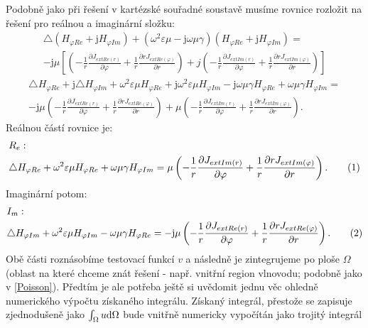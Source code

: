 \documentclass[12pt,a4paper,oneside]{article}
\numberwithin{equation}{section} %
\numberwithin{figure}{section} %
\numberwithin{table}{section} %
\newcommand{\mj}{\mathrm{j}} %
\newcommand\numberthis{\addtocounter{equation}{1}\tag{\theequation}}
\begin{document}
Podobně jako při řešení v kartézské souřadné soustavě musíme rovnice rozložit na řešení pro reálnou a imaginární složku:
\begin{equation}
\begin{split}
\triangle (H _{\varphi Re} + \mj H _{\varphi Im}) + (\omega ^2 \varepsilon \mu - \mj \omega \mu \gamma) (H _{\varphi Re} + \mj H _{\varphi Im}) =\\ 
- \mj \mu \left[ \left( - \frac{1}{r} \frac{\partial J _{extRe(r)}}{\partial \varphi} + \frac{1}{r} \frac{\partial r J _{extRe(\varphi)}}{\partial r} \right) + j \left( - \frac{1}{r} \frac{\partial J _{extIm(r)}}{\partial \varphi} + \frac{1}{r} \frac{\partial r J _{extIm(\varphi)}}{\partial r} \right) \right]
\end{split}
\end{equation}
\begin{equation}
\begin{split}
\triangle H _{\varphi Re} + \mj \triangle H _{\varphi Im} + \omega ^2 \varepsilon \mu H_ {\varphi Re} + \mj \omega ^2 \varepsilon \mu H _{\varphi Im} - \mj \omega \mu \gamma H _{\varphi Re} + \omega \mu \gamma H _{\varphi Im} =\\
- \mj \mu \left( - \frac{1}{r} \frac{\partial J _{extRe(r)}}{\partial \varphi} + \frac{1}{r} \frac{\partial r J _{extRe(\varphi)}}{\partial r} \right) + \mu \left( - \frac{1}{r} \frac{\partial J _{extIm(r)}}{\partial \varphi} + \frac{1}{r} \frac{\partial r J _{extIm(\varphi)}}{\partial r} \right) .
\end{split}
\end{equation}
Reálnou částí rovnice je:
\begin{align*}
&R_{e}:
\\
&\triangle H_ {\varphi Re} + \omega ^2 \varepsilon \mu H_ {\varphi Re} + \omega \mu \gamma H _{\varphi Im} = \mu \left( - \frac{1}{r} \frac{\partial J _{extIm(r)}}{\partial \varphi} + \frac{1}{r} \frac{\partial r J _{extIm(\varphi)}}{\partial r} \right) .
\numberthis
\end{align*}
Imaginární potom:
\begin{align*}
&I_{m}:
\\
&\triangle H _{\varphi Im} + \omega ^2 \varepsilon \mu H _{\varphi Im} - \omega \mu \gamma H _{\varphi Re} = - \mj \mu \left( - \frac{1}{r} \frac{\partial J _{extRe(r)}}{\partial \varphi} + \frac{1}{r} \frac{\partial r J _{extRe(\varphi)}}{\partial r} \right) .
\numberthis
\end{align*}
Obě části roznásobíme testovací funkcí $v$ a následně je  zintegrujeme po ploše $\Omega$ (oblast na které chceme znát řešení - např. vnitřní region vlnovodu; podobně jako v \ref{Poisson}). Předtím je ale potřeba ještě si uvědomit jednu věc ohledně numerického výpočtu získaného integrálu. Získaný integrál, přestože se zapisuje zjednodušeně jako $\int _{\Omega} u \mathrm{d} \Omega$ bude vnitřně numericky vypočítán jako trojitý integrál 
\end{document}
